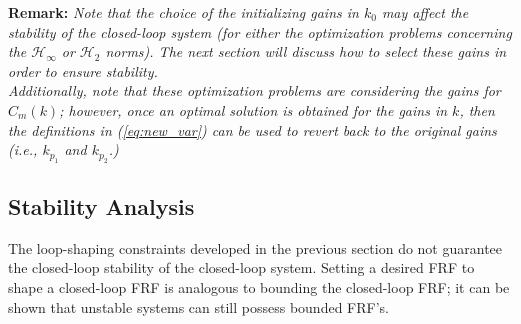 \documentclass[a4paper, 10pt, conference]{ieeeconf}
\begin{document}

{\bf Remark:} 
\textit{Note that the choice of the initializing gains in $k_0$ may affect the stability of the closed-loop system (for either the optimization problems concerning the $\mathcal{H}_\infty$ or $\mathcal{H}_2$ norms). The next section will discuss how to select these gains in order to ensure stability. \\ 
Additionally, note that these optimization problems are considering the gains for $C_m(k)$; however, once an optimal solution is obtained for the gains in $k$, then the definitions in (\ref{eq:new_var}) can be used to revert back to the original gains (i.e., $k_{p_1}$ and $k_{p_2}$.)}


\subsection{Stability Analysis}
The loop-shaping constraints developed in the previous section do not guarantee the closed-loop stability of the closed-loop system. Setting a desired FRF to shape a closed-loop FRF is analogous to bounding the closed-loop FRF; it can be shown that unstable systems can still possess bounded FRF's. 
\end{document}
